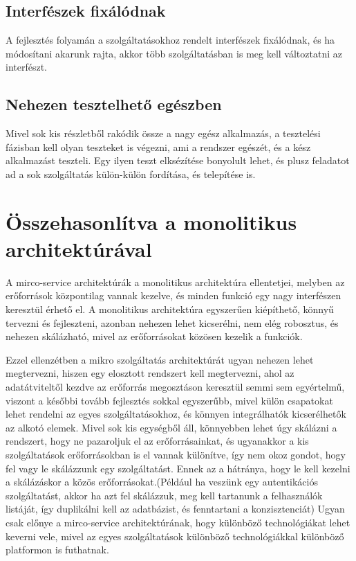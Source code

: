 \documentclass[11pt,magyar,a4paper,oneside,]{report}
\begin{document}
\subsection{Interfészek
fixálódnak}\label{interfuxe9szek-fixuxe1luxf3dnak}

A fejlesztés folyamán a szolgáltatásokhoz rendelt interfészek
fixálódnak, és ha módosítani akarunk rajta, akkor több szolgáltatásban
is meg kell változtatni az interfészt.

\subsection{Nehezen tesztelhető
egészben}\label{nehezen-tesztelhetux151-eguxe9szben}

Mivel sok kis részletből rakódik össze a nagy egész alkalmazás, a
tesztelési fázisban kell olyan teszteket is végezni, ami a rendszer
egészét, és a kész alkalmazást teszteli. Egy ilyen teszt elksézítése
bonyolult lehet, és plusz feladatot ad a sok szolgáltatás külön-külön
fordítása, és telepítése is.

\section{Összehasonlítva a monolitikus
architektúrával}\label{uxf6sszehasonluxedtva-a-monolitikus-architektuxfaruxe1val}

A mirco-service architektúrák a monolitikus architektúra ellentetjei,
melyben az erőforrások központilag vannak kezelve, és minden funkció egy
nagy interfészen keresztül érhető el. A monolitikus architektúra
egyszerűen kiépíthető, könnyű tervezni és fejleszteni, azonban nehezen
lehet kicserélni, nem elég robosztus, és nehezen skálázható, mivel az
erőforrásokat közösen kezelik a funkciók.

Ezzel ellenzétben a mikro szolgáltatás architektúrát ugyan nehezen lehet
megtervezni, hiszen egy elosztott rendszert kell megtervezni, ahol az
adatátviteltől kezdve az erőforrás megosztáson keresztül semmi sem
egyértelmű, viszont a későbbi tovább fejlesztés sokkal egyszerűbb, mivel
külön csapatokat lehet rendelni az egyes szolgáltatásokhoz, és könnyen
integrálhatók kicserélhetők az alkotó elemek. Mivel sok kis egységből
áll, könnyebben lehet úgy skálázni a rendszert, hogy ne pazaroljuk el az
erőforrásainkat, és ugyanakkor a kis szolgáltatások erőforrásokban is el
vannak különítve, így nem okoz gondot, hogy fel vagy le skálázzunk egy
szolgáltatást. Ennek az a hátránya, hogy le kell kezelni a skálázáskor a
közös erőforrásokat.(Például ha veszünk egy autentikációs szolgáltatást,
akkor ha azt fel skálázzuk, meg kell tartanunk a felhasználók listáját,
így duplikálni kell az adatbázist, és fenntartani a konzisztenciát)
Ugyan csak előnye a mirco-service architektúrának, hogy különböző
technológiákat lehet keverni vele, mivel az egyes szolgáltatások
különböző technológiákkal különböző platformon is futhatnak.
\end{document}
